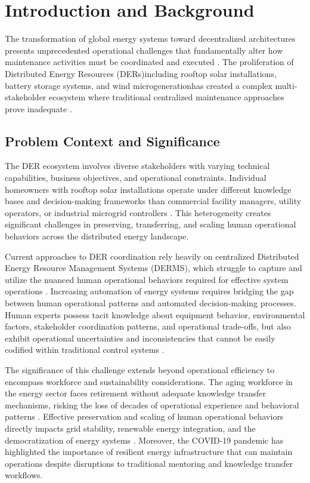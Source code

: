 \documentclass[12pt,a4paper]{article}
\newcommand{\emdash}{\textemdash}
\begin{document}
\newpage

\clearpage

\section{Introduction and Background}
\label{sec:introduction}

The transformation of global energy systems toward decentralized architectures presents unprecedented operational challenges that fundamentally alter how maintenance activities must be coordinated and executed \cite{10.1109/ACCESS.2024.3387400}. The proliferation of Distributed Energy Resources (DERs)\emdash{}including rooftop solar installations, battery storage systems, and wind microgeneration\emdash{}has created a complex multi-stakeholder ecosystem where traditional centralized maintenance approaches prove inadequate \cite{10.1016/j.rser.2020.110607}.

\subsection{Problem Context and Significance}

The DER ecosystem involves diverse stakeholders with varying technical capabilities, business objectives, and operational constraints. Individual homeowners with rooftop solar installations operate under different knowledge bases and decision-making frameworks than commercial facility managers, utility operators, or industrial microgrid controllers \cite{10.1016/j.seta.2022.102837}. This heterogeneity creates significant challenges in preserving, transferring, and scaling human operational behaviors across the distributed energy landscape.

Current approaches to DER coordination rely heavily on centralized Distributed Energy Resource Management Systems (DERMS), which struggle to capture and utilize the nuanced human operational behaviors required for effective system operations \cite{10.1049/iet-gtd.2019.1022}. Increasing automation of energy systems requires bridging the gap between human operational patterns and automated decision-making processes. Human experts possess tacit knowledge about equipment behavior, environmental factors, stakeholder coordination patterns, and operational trade-offs, but also exhibit operational uncertainties and inconsistencies that cannot be easily codified within traditional control systems \cite{10.1080/095281300146308}.

The significance of this challenge extends beyond operational efficiency to encompass workforce and sustainability considerations. The aging workforce in the energy sector faces retirement without adequate knowledge transfer mechanisms, risking the loss of decades of operational experience and behavioral patterns \cite{10.1109/ETFA61755.2024.10711109}. Effective preservation and scaling of human operational behaviors directly impacts grid stability, renewable energy integration, and the democratization of energy systems \cite{10.3390/en14154579}. Moreover, the COVID-19 pandemic has highlighted the importance of resilient energy infrastructure that can maintain operations despite disruptions to traditional mentoring and knowledge transfer workflows.
\end{document}
